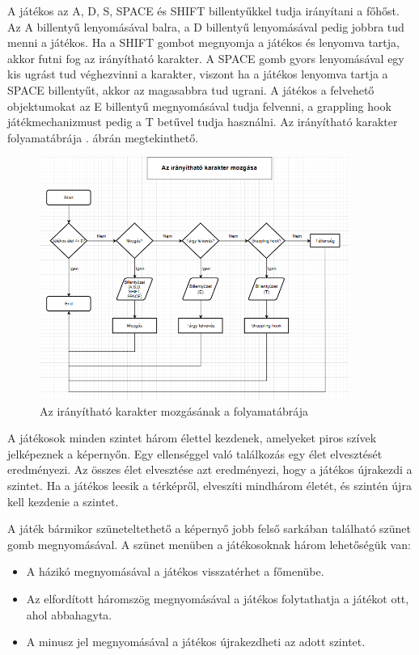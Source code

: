 A játékos az A, D, S, SPACE és SHIFT billentyűkkel tudja irányítani a főhőst. Az A billentyű lenyomásával balra, a D billentyű lenyomásával pedig jobbra tud menni a játékos. Ha a SHIFT gombot megnyomja a játékos és lenyomva tartja, akkor futni fog az irányítható karakter. A SPACE gomb gyors lenyomásával egy kis ugrást tud véghezvinni a karakter, viszont ha a játékos lenyomva tartja a SPACE billentyűt, akkor az magasabbra tud ugrani. A játékos a felvehető objektumokat az E billentyű megnyomásával tudja felvenni, a grappling hook játékmechanizmust pedig a T betűvel tudja használni. Az irányítható karakter folyamatábrája . ábrán megtekinthető.

\begin{figure}[ht]
\centering
\includegraphics[width =0.9\textwidth]{images/playerflowchart.png}
\caption{ Az irányítható karakter mozgásának a folyamatábrája}
\label{fig:playerflowchart}
\end{figure}

A játékosok minden szintet három élettel kezdenek, amelyeket piros szívek jelképeznek a képernyőn. Egy ellenséggel való találkozás egy élet elvesztését eredményezi. Az összes élet elvesztése azt eredményezi, hogy a játékos újrakezdi a szintet. Ha a játékos leesik a térképről, elveszíti mindhárom életét, és szintén újra kell kezdenie a szintet.

A játék bármikor szüneteltethető a képernyő jobb felső sarkában található szünet gomb megnyomásával. A szünet menüben a játékosoknak három lehetőségük van:
\begin{itemize}
\item A házikó megnyomásával a játékos visszatérhet a főmenübe.
\item Az elfordított háromszög megnyomásával a játékos folytathatja a játékot ott, ahol abbahagyta.
\item A minusz jel megnyomásával a játékos újrakezdheti az adott szintet.
\end{itemize}

